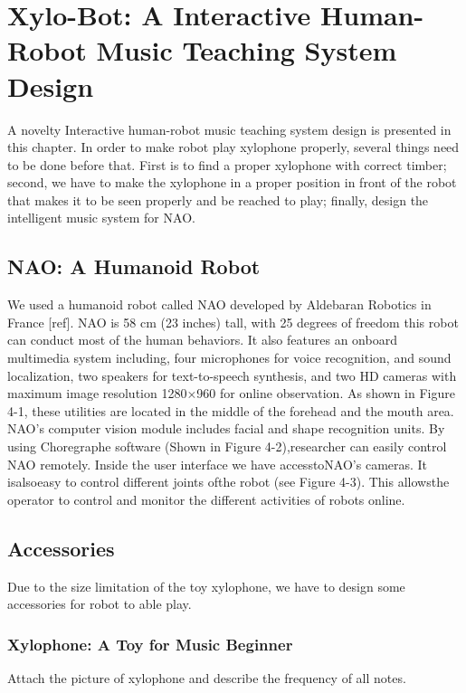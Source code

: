 \chapter{Xylo-Bot: A Interactive Human-Robot Music Teaching System Design} 
A novelty Interactive human-robot music teaching system design is presented in this chapter. 
In order to make robot play xylophone properly, several things need to be done before that. First is to find a proper xylophone with correct timber; second, we have to make the xylophone in a proper position in front of the robot that makes it to be seen properly and be reached to play; finally, design the intelligent music system for NAO. 

\section{NAO: A Humanoid Robot}
We used a humanoid  robot called NAO developed  by Aldebaran Robotics in  France [ref].  NAO  is  58  cm  (23  inches)  tall,  with  25  degrees  of  freedom  this  robot  can  conduct most  of  the  human  behaviors.  It  also  features  an  onboard  multimedia  system  including, four  microphones  for  voice  recognition,  and  sound  localization,  two  speakers  for  text-to-speech  synthesis,  and  two  HD  cameras  with  maximum  image  resolution 1280×960 for online  observation.    As  shown  in Figure 4-1, these  utilities  are  located  in  the  middle  of the forehead  and the mouth  area.  NAO’s  computer  vision  module  includes  facial  and  shape recognition  units. 
By  using Choregraphe software (Shown  in  Figure 4-2),researcher  can  easily  control  NAO remotely.  Inside  the user interface we  have  accesstoNAO’s cameras. It  isalsoeasy  to control different  joints  ofthe robot (see  Figure 4-3). This  allowsthe  operator to  control  and monitor  the different  activities  of robots  online. 

\section{Accessories}
Due to the size limitation of the toy xylophone, we have to design some accessories for robot to able play.

\subsection{Xylophone: A Toy for Music Beginner}
Attach the picture of xylophone and describe the frequency of all notes.

